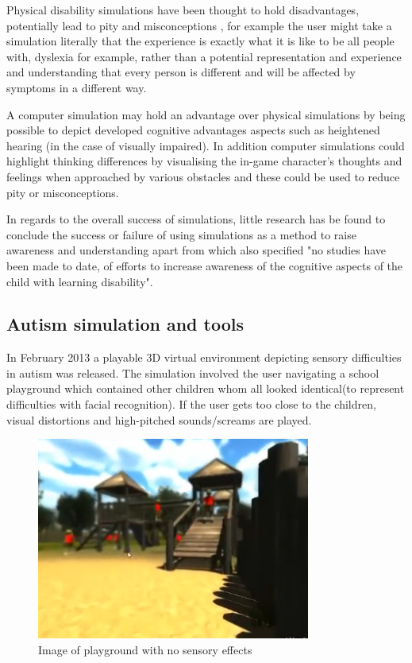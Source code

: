 \documentclass[11pt]{report}
\begin{document}
Physical disability simulations have been thought to hold disadvantages, potentially lead to pity and misconceptions \cite{dd}, for example the user might take a simulation literally that the experience is exactly what it is like to be all people with, dyslexia for example, rather than a potential representation and experience and understanding that every person is different and will be affected by symptoms in a different way.

A computer simulation may hold an advantage over physical simulations by being possible to depict developed cognitive advantages aspects such as heightened hearing (in the case of visually impaired). In addition computer simulations could highlight thinking differences by visualising the in-game character's thoughts and feelings when approached by various obstacles and these could be used to reduce pity or misconceptions.

In regards to the overall success of simulations, little research has be found to conclude the success or failure of using simulations as a method to raise awareness and understanding apart from \cite{dyslexicsimpar} which also specified "no studies have been made to date, of efforts to increase awareness of the cognitive aspects of the child with learning disability".

\subsection{Autism simulation and tools}

In February 2013 a playable 3D virtual environment depicting sensory difficulties in autism was released. The simulation involved the user navigating a school playground which contained other children whom all looked identical(to represent difficulties with facial recognition). If the user gets too close to the children, visual distortions and high-pitched sounds/screams are played. 

\begin{figure}[H]
\centering
\includegraphics[width=90mm]{images/litreview/autisim1.png}
\caption{Image of playground with no sensory effects}
\label{autisim1}
\end{figure}
\end{document}
